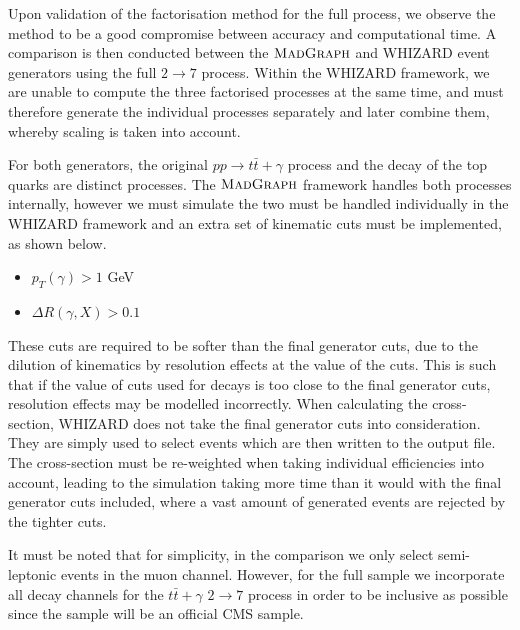 Upon validation of the factorisation method for the full process, we observe the method to be a good compromise between accuracy and computational time. A comparison is then conducted between the $\textsc{MadGraph}$ and WHIZARD event generators using the full $2 \to 7$ process. Within the WHIZARD framework, we are unable to compute the three factorised processes at the same time, and must therefore generate the individual processes separately and later combine them, whereby scaling is taken into account. 

For both generators, the original $pp \to t\bar{t}+\gamma$ process and the decay of the top quarks are distinct processes. The $\textsc{MadGraph}$ framework handles both processes internally, however we must simulate the two must be handled individually in the WHIZARD framework and an extra set of kinematic cuts must be implemented, as shown below.

\begin{itemize}
	\item $p_T(\gamma) > 1$ GeV
	\item $\Delta R (\gamma, X) > 0.1$
\end{itemize}

These cuts are required to be softer than the final generator cuts, due to the dilution of kinematics by resolution effects at the value of the cuts. This is such that if the value of cuts used for decays is too close to the final generator cuts, resolution effects may be modelled incorrectly. When calculating the cross-section, WHIZARD does not take the final generator cuts into consideration. They are simply used to select events which are then written to the output file. The cross-section must be re-weighted when taking individual efficiencies into account, leading to the simulation taking more time than it would with the final generator cuts included, where a vast amount of generated events are rejected by the tighter cuts.

It must be noted that for simplicity, in the comparison we only select semi-leptonic events in the muon channel. However, for the full sample we incorporate all decay channels for the $t\bar{t}+\gamma$ $2 \to 7$ process in order to be inclusive as possible since the sample will be an official CMS sample. 

